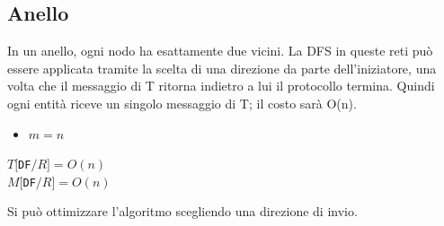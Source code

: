 \subsection{Anello}
In un anello, ogni nodo ha esattamente due vicini. La DFS in queste reti può
essere applicata tramite la scelta di una direzione da parte dell'iniziatore,
una volta che il messaggio di T ritorna indietro a lui il protocollo termina.
Quindi ogni entità riceve un singolo messaggio di T; il costo sarà O(n).
\begin{itemize}
    \item $m = n$
\end{itemize}
\begin{center}
    $T[$\texttt{DF}$/R] = O(n)$ \\
    $M[$\texttt{DF}$/R] = O(n)$
\end{center}
Si può ottimizzare l'algoritmo scegliendo una direzione di invio.

